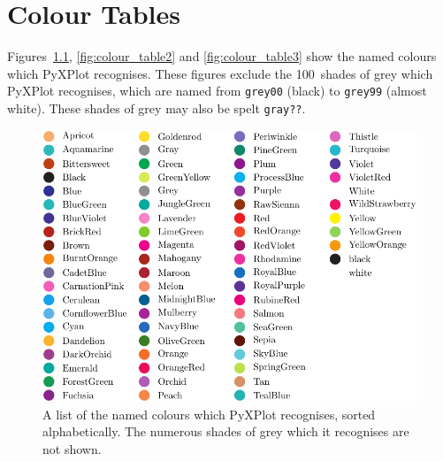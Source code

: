 %
%
%
%
%



\chapter{Colour Tables}
\label{ch:colour_charts}

 Figures~\ref{fig:colour_table1}, \ref{fig:colour_table2}
and \ref{fig:colour_table3} show the named colours which PyXPlot recognises.
These figures exclude the 100~shades of grey which PyXPlot recognises, which
are named from {\tt grey00} (black) to {\tt grey99} (almost white).  These
shades of grey may also be spelt {\tt gray??}.  

\begin{figure}
\begin{center}
\includegraphics[width=\textwidth]{figures/pyx_colours2}
\end{center}
\caption[A list of the named colours which PyXPlot recognises, sorted alphabetically]
{A list of the named colours which PyXPlot recognises, sorted alphabetically. The numerous shades of grey which it recognises are not shown.}
\label{fig:colour_table1}
\end{figure}

